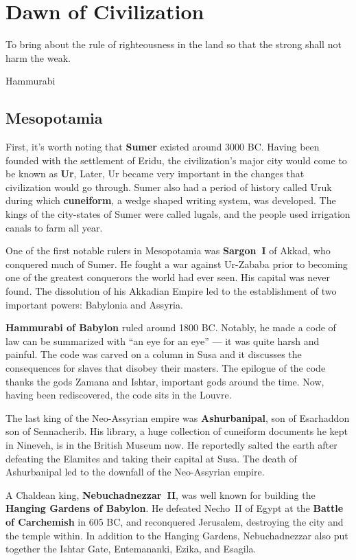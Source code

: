 \chapter{Dawn of Civilization}

\epigraph{%
  To bring about the rule of righteousness in the land so that the strong shall not harm the weak.
}{Hammurabi}

\section{Mesopotamia}

First, it's worth noting that \textbf{Sumer} existed around 3000 BC\@.
Having been founded with the settlement of Eridu,
the civilization's major city would come to be known as \textbf{Ur},
Later, Ur became very important in the changes that civilization would go through.
Sumer also had a period of history called Uruk during which \textbf{cuneiform}, a wedge shaped writing system,
was developed.
The kings of the city-states of Sumer were called lugals,
and the people used irrigation canals to farm all year.

One of the first notable rulers in Mesopotamia was \textbf{Sargon~I} of Akkad, who conquered much of Sumer.
He fought a war against Ur-Zababa prior to becoming one of the greatest conquerors the world had ever seen.
His capital was never found.
The dissolution of his Akkadian Empire led to the establishment of two important powers: Babylonia and Assyria.

\textbf{Hammurabi of Babylon} ruled around 1800 BC\@.
Notably, he made a code of law can be summarized with ``an eye for an eye'' --- it was quite harsh and painful.
The code was carved on a column in Susa and it discusses the consequences for slaves that disobey their masters.
The epilogue of the code thanks the gods Zamana and Ishtar, important gods around the time.
Now, having been rediscovered, the code sits in the Louvre.

The last king of the Neo-Assyrian empire was \textbf{Ashurbanipal}, son of Esarhaddon son of Sennacherib.
His library, a huge collection of cuneiform documents he kept in Nineveh, is in the British Museum now.
He reportedly salted the earth after defeating the Elamites and taking their capital at Susa.
The death of Ashurbanipal led to the downfall of the Neo-Assyrian empire.

A Chaldean king, \textbf{Nebuchadnezzar~II}, was well known for building the \textbf{Hanging Gardens of Babylon}.
He defeated Necho~II of Egypt at the \textbf{Battle of Carchemish} in 605 BC,
and reconquered Jerusalem, destroying the city and the temple within.
In addition to the Hanging Gardens, Nebuchadnezzar also put together the Ishtar Gate, Entemananki, Ezika, and Esagila.


